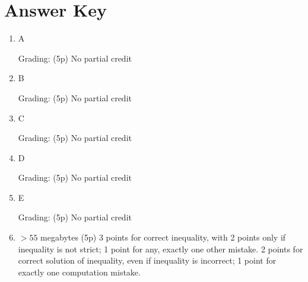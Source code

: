 \documentclass{ximera}
\begin{document}
\section*{Answer Key}
\begin{enumerate}
  \item A


Grading: (5p) No partial credit

\item  B

Grading: (5p) No partial credit

\item C

Grading: (5p) No partial credit

\item D

Grading: (5p) No partial credit\\

\item E

Grading: (5p) No partial credit

    \item $>55$ megabytes (5p) 3 points for correct inequality, with 2 points only if inequality is not strict; 1 point for  any, exactly one other mistake. 2 points for correct solution of inequality, even if inequality is  incorrect; 1 point for exactly one computation mistake. \\



\end{enumerate}
\end{document}

